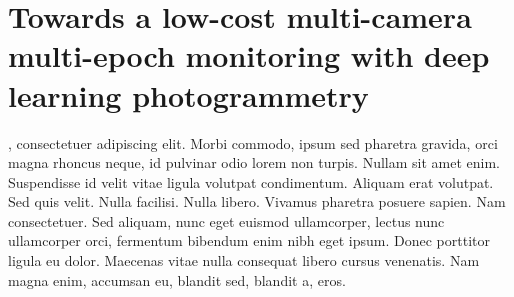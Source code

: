 \graphicspath{{figures/chapter5/}}
\onehalfspacing

\chapter{Towards a low-cost multi-camera multi-epoch monitoring with deep learning photogrammetry}\label{ch:5}

, consectetuer adipiscing elit. Morbi commodo,
ipsum sed pharetra gravida, orci magna rhoncus neque, id pulvinar odio lorem non turpis.
Nullam sit amet enim. Suspendisse id velit vitae ligula volutpat condimentum. Aliquam
erat volutpat. Sed quis velit. Nulla facilisi. Nulla libero. Vivamus pharetra posuere
sapien. Nam consectetuer. Sed aliquam, nunc eget euismod ullamcorper, lectus nunc
ullamcorper orci, fermentum bibendum enim nibh eget ipsum. Donec porttitor ligula eu
dolor. Maecenas vitae nulla consequat libero cursus venenatis. Nam magna enim, accumsan
eu, blandit sed, blandit a, eros.

\makechapterbibliography{}
